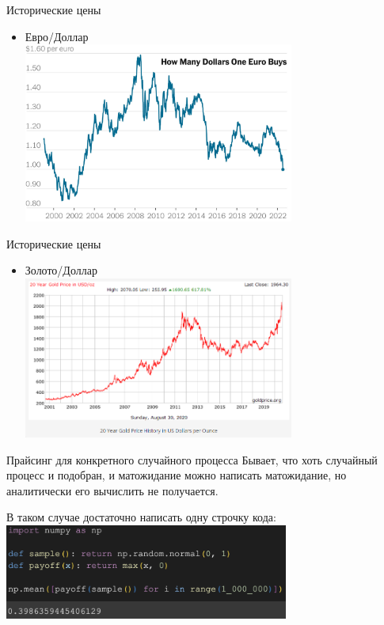 \documentclass{beamer}
\begin{document}
        \begin{frame}{Исторические цены}
            \begin{itemize}
                \item Евро/Доллар\\
                \includegraphics[width=0.7\textwidth]{euro-dollar-parity-alt-promo-superJumbo.jpg}
            \end{itemize}
        \end{frame}

        \begin{frame}{Исторические цены}
            \begin{itemize}
                \item Золото/Доллар\\
                \includegraphics[width=0.7\textwidth]{gold-20y.png}
            \end{itemize}
        \end{frame}

        \begin{frame}{Прайсинг для конкретного случайного процесса}
            Бывает, что хоть случайный процесс и подобран, и матожидание можно написать матожидание, но аналитически его вычислить не получается.

            В таком случае достаточно написать одну строчку кода:
            \includegraphics[width=0.7\textwidth]{code.png}

        \end{frame}
\end{document}
